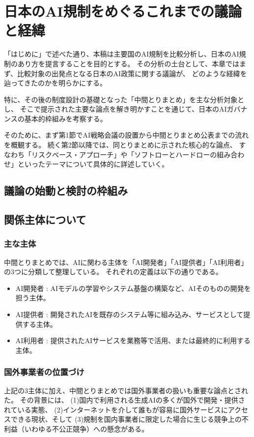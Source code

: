\chapter{日本のAI規制をめぐるこれまでの議論と経緯}
「はじめに」で述べた通り、本稿は主要国のAI規制を比較分析し、日本のAI規制のあり方を提言することを目的とする。
その分析の土台として、本章ではまず、比較対象の出発点となる日本のAI政策に関する議論が、
どのような経緯を辿ってきたのかを明らかにする。

特に、その後の制度設計の基礎となった「中間とりまとめ」を主な分析対象とし、
そこで提示された主要な論点を解き明かすことを通じて、日本のAIガバナンスの基本的枠組みを考察する。

そのために、まず第1節でAI戦略会議の設置から中間とりまとめ公表までの流れを概観する。
続く第2節以降では、同とりまとめに示された核心的な論点、
すなわち「リスクベース・アプローチ」や「ソフトローとハードローの組み合わせ」といったテーマについて具体的に詳述していく。


\section{議論の始動と検討の枠組み}


\section{関係主体について}

\subsection{主な主体}
中間とりまとめでは、AIに関わる主体を「AI開発者」「AI提供者」「AI利用者」の3つに分類して整理している。
それぞれの定義は以下の通りである。

\begin{itemize}
  \item AI開発者 : AIモデルの学習やシステム基盤の構築など、AIそのものの開発を担う主体。
  \item AI提供者 : 開発されたAIを既存のシステム等に組み込み、サービスとして提供する主体。
  \item AI利用者 : 提供されたAIサービスを業務等で活用、または最終的に利用する主体。
\end{itemize}

\subsection{国外事業者の位置づけ}
上記の3主体に加え、中間とりまとめでは国外事業者の扱いも重要な論点とされた。
その背景には、
(1)国内で利用される生成AIの多くが国外で開発・提供されている実態、
(2)インターネットを介して誰もが容易に国外サービスにアクセスできる現状、そして
(3)規制を国内事業者に限定した場合に生じる競争上の不利益（いわゆる不公正競争）への懸念がある。

